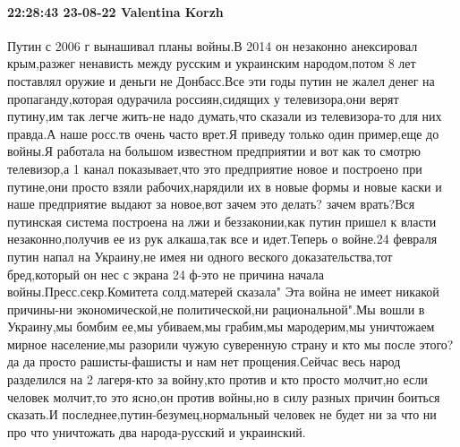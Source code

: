  
 
 
 
 

\paragraph{22:28:43 23-08-22 Valentina Korzh}

Путин с 2006 г вынашивал планы войны.В 2014 он незаконно анексировал
крым,разжег ненависть между русским и украинским народом,потом 8 лет поставлял
оружие и деньги не Донбасс.Все эти годы путин не жалел денег на
пропаганду,которая одурачила россиян,сидящих у телевизора,они верят путину,им
так легче жить-не надо думать,что сказали из телевизора-то для них правда.А
наше росс.тв очень часто врет.Я приведу только один пример,еще до войны.Я
работала на большом известном предприятии и вот как то смотрю телевизор,а 1
канал показывает,что это предприятие новое и построено при путине,они просто
взяли рабочих,нарядили их в новые формы и новые каски и наше предприятие выдают
за новое,вот зачем это делать? зачем врать?Вся путинская система построена на
лжи и беззаконии,как путин пришел к власти незаконно,получив ее из рук
алкаша,так все и идет.Теперь о войне.24 февраля путин напал на Украину,не имея
ни одного веского доказательства,тот бред,который он нес с экрана 24 ф-это не
причина начала войны.Пресс.секр.Комитета солд.матерей сказала" Эта война не
имеет никакой причины-ни экономической,не политической,ни рациональной".Мы
вошли в Украину,мы бомбим ее,мы убиваем,мы грабим,мы мародерим,мы уничтожаем
мирное население,мы разорили чужую суверенную страну и кто мы после этого? да
да просто рашисты-фашисты и нам нет прощения.Сейчас весь народ разделился на 2
лагеря-кто за войну,кто против и кто просто молчит,но если человек молчит,то
это ясно,он против войны,но в силу разных причин боиться сказать.И
последнее,путин-безумец,нормальный человек не будет ни за что ни про что
уничтожать два народа-русский и украинский.
